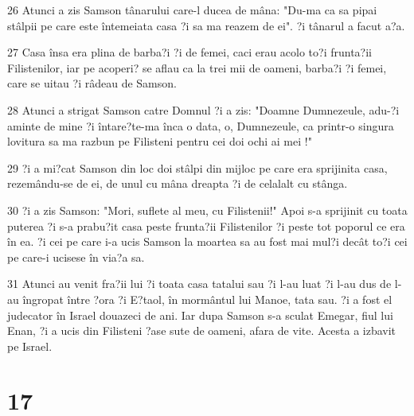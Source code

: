 \par 26 Atunci a zis Samson tânarului care-l ducea de mâna: "Du-ma ca sa pipai stâlpii pe care este întemeiata casa ?i sa ma reazem de ei". ?i tânarul a facut a?a.
\par 27 Casa însa era plina de barba?i ?i de femei, caci erau acolo to?i frunta?ii Filistenilor, iar pe acoperi? se aflau ca la trei mii de oameni, barba?i ?i femei, care se uitau ?i râdeau de Samson.
\par 28 Atunci a strigat Samson catre Domnul ?i a zis: "Doamne Dumnezeule, adu-?i aminte de mine ?i întare?te-ma înca o data, o, Dumnezeule, ca printr-o singura lovitura sa ma razbun pe Filisteni pentru cei doi ochi ai mei !"
\par 29 ?i a mi?cat Samson din loc doi stâlpi din mijloc pe care era sprijinita casa, rezemându-se de ei, de unul cu mâna dreapta ?i de celalalt cu stânga.
\par 30 ?i a zis Samson: "Mori, suflete al meu, cu Filistenii!" Apoi s-a sprijinit cu toata puterea ?i s-a prabu?it casa peste frunta?ii Filistenilor ?i peste tot poporul ce era în ea. ?i cei pe care i-a ucis Samson la moartea sa au fost mai mul?i decât to?i cei pe care-i ucisese în via?a sa.
\par 31 Atunci au venit fra?ii lui ?i toata casa tatalui sau ?i l-au luat ?i l-au dus de l-au îngropat între ?ora ?i E?taol, în mormântul lui Manoe, tata sau. ?i a fost el judecator în Israel douazeci de ani. Iar dupa Samson s-a sculat Emegar, fiul lui Enan, ?i a ucis din Filisteni ?ase sute de oameni, afara de vite. Acesta a izbavit pe Israel.

\chapter{17}

